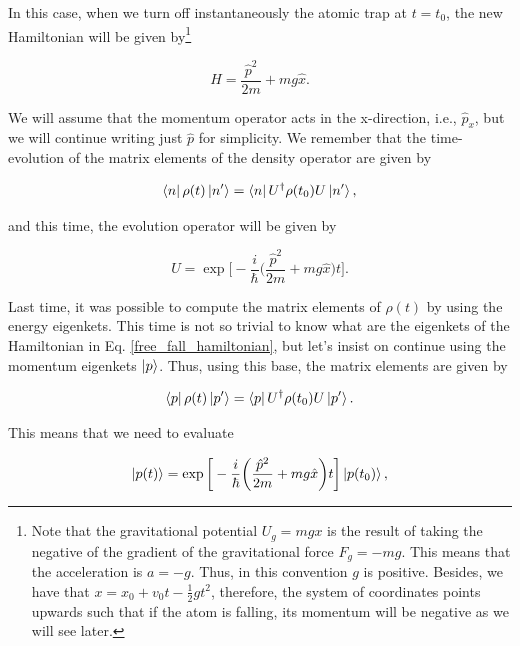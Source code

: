 \documentclass{article}
\begin{document}
In this case, when we turn off instantaneously the atomic trap at $t=t_{0}$, the new Hamiltonian will be given by\footnote{Note that the gravitational potential $U_{g}=mgx$ is the result of taking the negative of the gradient of the gravitational force $F_{g}=-mg$. This means that the acceleration is $a=-g$. Thus, in this convention $g$ is positive. Besides, we have that $x=x_{0}+v_{0}t-\frac{1}{2}gt^{2}$, therefore, the system of coordinates points upwards such that if the atom is falling, its momentum will be negative as we will see later.}

\begin{equation}\label{free_fall_hamiltonian}
    H = \frac{\hat{p}^{2}}{2m} + mg\hat{x}.
\end{equation}

We will assume that the momentum operator acts in the x-direction, i.e., $\hat{p}_{x}$, but we will continue writing just $\hat{p}$ for simplicity.
We remember that the time-evolution of the matrix elements of the density operator are given by

\begin{equation}
    \bra{n} \rho (t) \ket{n'} = \bra{n} U^{\dagger} \rho (t_{0}) U \ket{n'},
\end{equation}

and this time, the evolution operator will be given by

\begin{equation}
    U = \exp \bigg[-\frac{i}{\hbar} \bigg( \frac{\hat{p}^{2}}{2m} + mg\hat{x} \bigg) t \bigg].
\end{equation}

Last time, it was possible to compute the matrix elements of $\rho (t)$ by using the energy eigenkets. This time is not so trivial to know what are the eigenkets of the Hamiltonian in Eq. \ref{free_fall_hamiltonian}, but let's insist on continue using the momentum eigenkets $\ket{p}$. Thus, using this base, the matrix elements are given by

\begin{equation}
    \bra{p} \rho (t) \ket{p'} = \bra{p} U^{\dagger} \rho (t_{0}) U \ket{p'}.
\end{equation}

This means that we need to evaluate

\begin{equation}
    \ket{p(t)} = \exp \bigg[-\frac{i}{\hbar} \bigg( \frac{\hat{p}^{2}}{2m} + mg\hat{x} \bigg) t \bigg] \ket{p(t_{0})}, 
\end{equation}
\end{document}
